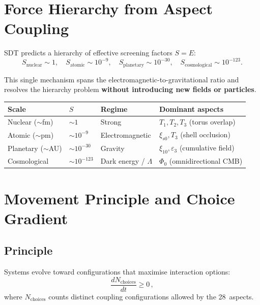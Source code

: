 \section{Force Hierarchy from Aspect Coupling}

SDT predicts a hierarchy of effective screening factors $S = E$:
\begin{equation}
  S_{\text{nuclear}} \sim 1,
  \quad
  S_{\text{atomic}} \sim 10^{-9},
  \quad
  S_{\text{planetary}} \sim 10^{-30},
  \quad
  S_{\text{cosmological}} \sim 10^{-123}.
\end{equation}

This single mechanism spans the electromagnetic-to-gravitational ratio and resolves the hierarchy problem \textbf{without introducing new fields or particles}.

\begin{center}
\begin{tabular}{llll}
\hline
\textbf{Scale} & \textbf{$S$} & \textbf{Regime} & \textbf{Dominant aspects} \\
\hline
Nuclear (${\sim}$fm) & $\sim 1$ & Strong & $T_1, T_2, T_3$ (torus overlap) \\
Atomic (${\sim}$pm) & $\sim 10^{-9}$ & Electromagnetic & $\xi_{s0}, T_3$ (shell occlusion) \\
Planetary (${\sim}$AU) & $\sim 10^{-30}$ & Gravity & $\xi_{10}, \varepsilon_3$ (cumulative field) \\
Cosmological & $\sim 10^{-123}$ & Dark energy / $\Lambda$ & $\Phi_0$ (omnidirectional CMB) \\
\hline
\end{tabular}
\end{center}


\section{Movement Principle and Choice Gradient}

\subsection{Principle}

Systems evolve toward configurations that maximise interaction options:
\begin{equation}
  \frac{dN_{\text{choices}}}{dt} \ge 0\,,
\end{equation}
where $N_{\text{choices}}$ counts distinct coupling configurations allowed by the 28~aspects.

